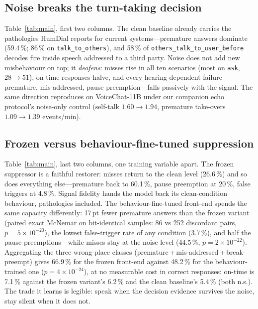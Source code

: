 \documentclass{article}
\newcommand{\vc}{VoiceChat}
\begin{document}
\subsection{Noise breaks the turn-taking decision}
Table~\ref{tab:main}, first two columns. The clean baseline already carries the pathologies
HumDial reports for current systems---premature answers dominate (59.4\,\%; 86\,\% on
\texttt{talk\_\allowbreak to\_\allowbreak others}), and 58\,\% of \texttt{others\_\allowbreak talk\_\allowbreak to\_\allowbreak user\_\allowbreak before} decodes fire
inside speech addressed to a third party. Noise does not add new misbehaviour on top; it
\emph{deafens}: misses rise in all ten scenarios (most on \texttt{ask}, $28\to51$), on-time
responses halve, and every hearing-dependent failure---premature, mis-addressed, pause
preemption---falls passively with the signal. The same direction reproduces on \vc-11B under our companion echo protocol's noise-only
control (self-talk $1.60\to1.94$, premature take-overs $1.09\to1.39$ events/min).

\subsection{Frozen versus behaviour-fine-tuned suppression}
Table~\ref{tab:main}, last two columns, one training variable apart. The frozen suppressor is a
faithful restorer: misses return to the clean level (26.6\,\%) and so does everything
else---premature back to 60.1\,\%, pause preemption at 20\,\%, false triggers at 4.8\,\%. Signal
fidelity hands the model back its clean-condition behaviour, pathologies included.
The behaviour-fine-tuned front-end spends the same capacity differently: 17\,pt fewer premature
answers than the frozen variant (paired exact McNemar on bit-identical samples: 86 vs 252
discordant pairs, $p=5{\times}10^{-20}$), the lowest false-trigger rate of any condition
(3.7\,\%), and half the pause preemptions---while misses stay at the noise level (44.5\,\%,
$p=2{\times}10^{-22}$). Aggregating the three wrong-place classes
(premature\,+\,mis-addressed\,+\,break-preempt) gives 66.9\,\% for the frozen front-end against
48.2\,\% for the behaviour-trained one ($p=4{\times}10^{-24}$), at no measurable cost in
correct responses: on-time is 7.1\,\% against the frozen variant's 6.2\,\% and the clean
baseline's 5.4\,\% (both n.s.). The trade it learns is legible: speak when the decision evidence
survives the noise, stay silent when it does not.
\end{document}
